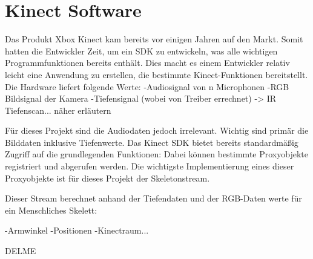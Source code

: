 \section{Kinect Software}
Das Produkt Xbox Kinect kam bereits vor einigen Jahren auf den Markt. Somit hatten die Entwickler Zeit, um ein SDK zu entwickeln, was alle wichtigen Programmfunktionen bereits enthält. Dies macht es einem Entwickler relativ leicht eine Anwendung zu erstellen, die bestimmte Kinect-Funktionen bereitstellt. 
Die Hardware liefert folgende Werte:
-Audiosignal von n Microphonen
-RGB Bildsignal der Kamera
-Tiefensignal (wobei von Treiber errechnet) -> IR Tiefenscan... näher erläutern

Für dieses Projekt sind die Audiodaten jedoch irrelevant. Wichtig sind primär die Bilddaten inklusive Tiefenwerte.
Das Kinect SDK bietet bereits standardmäßig Zugriff auf die grundlegenden Funktionen:
Dabei können bestimmte Proxyobjekte registriert und abgerufen werden. Die wichtigste Implementierung eines dieser Proxyobjekte ist für dieses Projekt der Skeletonstream.

Dieser Stream berechnet anhand der Tiefendaten und der RGB-Daten werte für ein Menschliches Skelett:

-Armwinkel
-Positionen
-Kinectraum...




DELME\cite{hertzberg2009mobile}


